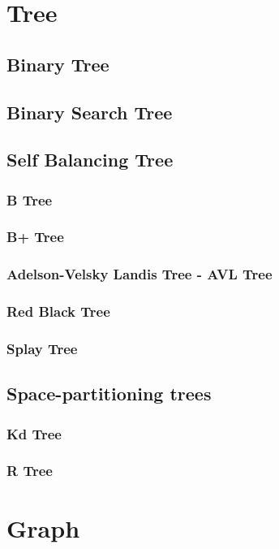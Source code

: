 \chapter{Tree}

\section{Binary Tree}
\section{Binary Search Tree}

\section{Self Balancing Tree}
\subsection{B Tree}
\subsection{B+ Tree}

\subsection{Adelson-Velsky Landis Tree - AVL Tree}
\subsection{Red Black Tree}
\subsection{Splay Tree}


\section{Space-partitioning trees}
\subsection{Kd Tree}
\subsection{R Tree}

\chapter{Graph}

